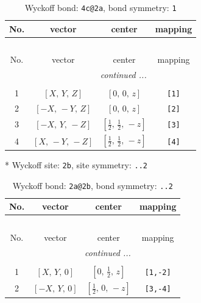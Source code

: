 \documentclass[fleqn,8pt]{jsarticle}
\begin{document}
\renewcommand{\arraystretch}{1.2}
\begin{longtable}{cccc}
\caption{Wyckoff bond: {\tt 4c@2a}, bond symmetry: {\tt 1}}
 \\
 \hline \hline
No. & vector & center & mapping \\ \hline \endfirsthead

\multicolumn{3}{l}{\tablename\ \thetable{}} \\
 \hline \hline
No. & vector & center & mapping \\ \hline \endhead

 \hline \hline
\multicolumn{3}{r}{\footnotesize\it continued ...} \\ \endfoot

 \hline \hline
\multicolumn{3}{r}{} \\ \endlastfoot

1 & $\left[ X,\, Y,\, Z \right]$ & $\left[ 0,\, 0,\, z \right]$ & {\tt [1]} \\ \hline
2 & $\left[ - X,\, - Y,\, Z \right]$ & $\left[ 0,\, 0,\, z \right]$ & {\tt [2]} \\ \hline
3 & $\left[ - X,\, Y,\, - Z \right]$ & $\left[ \frac{1}{2},\, \frac{1}{2},\, - z \right]$ & {\tt [3]} \\ \hline
4 & $\left[ X,\, - Y,\, - Z \right]$ & $\left[ \frac{1}{2},\, \frac{1}{2},\, - z \right]$ & {\tt [4]} \\
\end{longtable}
* Wyckoff site: {\tt 2b}, site symmetry: {\tt ..2}
\renewcommand{\arraystretch}{1.2}
\begin{longtable}{cccc}
\caption{Wyckoff bond: {\tt 2a@2b}, bond symmetry: {\tt ..2}}
 \\
 \hline \hline
No. & vector & center & mapping \\ \hline \endfirsthead

\multicolumn{3}{l}{\tablename\ \thetable{}} \\
 \hline \hline
No. & vector & center & mapping \\ \hline \endhead

 \hline \hline
\multicolumn{3}{r}{\footnotesize\it continued ...} \\ \endfoot

 \hline \hline
\multicolumn{3}{r}{} \\ \endlastfoot

1 & $\left[ X,\, Y,\, 0 \right]$ & $\left[ 0,\, \frac{1}{2},\, z \right]$ & {\tt [1,-2]} \\ \hline
2 & $\left[ - X,\, Y,\, 0 \right]$ & $\left[ \frac{1}{2},\, 0,\, - z \right]$ & {\tt [3,-4]} \\
\end{longtable}
\end{document}
